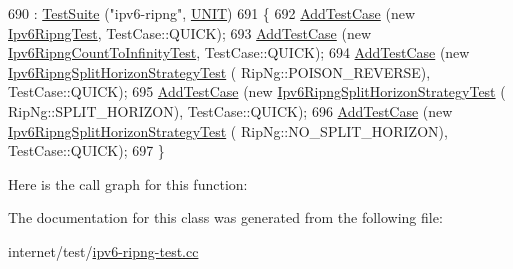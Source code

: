 \begin{DoxyCode}
690                         : \hyperlink{classns3_1_1TestSuite_a904b0c40583b744d30908aeb94636d1a}{TestSuite} (\textcolor{stringliteral}{"ipv6-ripng"}, \hyperlink{classns3_1_1TestSuite_a1ebfcab34ec8161e085e8e3a1855eae0a3885375a3787abf60431f8454b3cadbd}{UNIT})
691   \{
692     \hyperlink{classns3_1_1TestCase_a3718088e3eefd5d6454569d2e0ddd835}{AddTestCase} (\textcolor{keyword}{new} \hyperlink{classIpv6RipngTest}{Ipv6RipngTest}, TestCase::QUICK);
693     \hyperlink{classns3_1_1TestCase_a3718088e3eefd5d6454569d2e0ddd835}{AddTestCase} (\textcolor{keyword}{new} \hyperlink{classIpv6RipngCountToInfinityTest}{Ipv6RipngCountToInfinityTest}, TestCase::QUICK);
694     \hyperlink{classns3_1_1TestCase_a3718088e3eefd5d6454569d2e0ddd835}{AddTestCase} (\textcolor{keyword}{new} \hyperlink{classIpv6RipngSplitHorizonStrategyTest}{Ipv6RipngSplitHorizonStrategyTest} (
      RipNg::POISON\_REVERSE), TestCase::QUICK);
695     \hyperlink{classns3_1_1TestCase_a3718088e3eefd5d6454569d2e0ddd835}{AddTestCase} (\textcolor{keyword}{new} \hyperlink{classIpv6RipngSplitHorizonStrategyTest}{Ipv6RipngSplitHorizonStrategyTest} (
      RipNg::SPLIT\_HORIZON), TestCase::QUICK);
696     \hyperlink{classns3_1_1TestCase_a3718088e3eefd5d6454569d2e0ddd835}{AddTestCase} (\textcolor{keyword}{new} \hyperlink{classIpv6RipngSplitHorizonStrategyTest}{Ipv6RipngSplitHorizonStrategyTest} (
      RipNg::NO\_SPLIT\_HORIZON), TestCase::QUICK);
697   \}
\end{DoxyCode}


Here is the call graph for this function\+:




The documentation for this class was generated from the following file\+:\begin{DoxyCompactItemize}
\item 
internet/test/\hyperlink{ipv6-ripng-test_8cc}{ipv6-\/ripng-\/test.\+cc}\end{DoxyCompactItemize}
